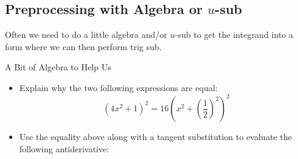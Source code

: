 \subsection{Preprocessing with Algebra or $u$-sub}  Often we need to do a little algebra and/or $u$-sub to get the integrand into a form where we can then perform trig sub.


\begin{exercise}{A Bit of Algebra to Help Us \Coffeecup \Coffeecup \Coffeecup }

\begin{itemize}
\item Explain why the two following expressions are equal: $$(4x^2+1)^2=16\left(x^2+\left(\frac{1}{2}\right)^2\right)^2$$

\item Use the equality above along with a tangent substitution to evaluate the following antiderivative:


\end{itemize}
\end{exercise}
